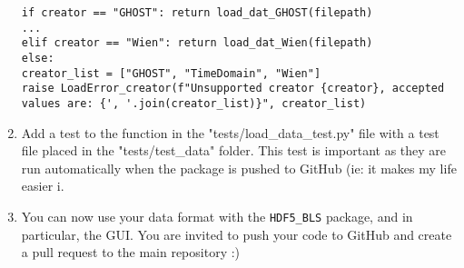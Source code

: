 \begin{enumerate}
\begin{lstlisting}
if creator == "GHOST": return load_dat_GHOST(filepath)
...
elif creator == "Wien": return load_dat_Wien(filepath)
else:
creator_list = ["GHOST", "TimeDomain", "Wien"]
raise LoadError_creator(f"Unsupported creator {creator}, accepted values are: {', '.join(creator_list)}", creator_list)
\end{lstlisting}
    \item Add a test to the function in the "tests/load\_data\_test.py" file with a test file placed in the "tests/test\_data" folder. This test is important as they are run automatically when the package is pushed to GitHub (ie: it makes my life easier ^^). 
    \item You can now use your data format with the \texttt{HDF5\_BLS} package, and in particular, the GUI. You are invited to push your code to GitHub and create a pull request to the main repository :)
\end{enumerate}
